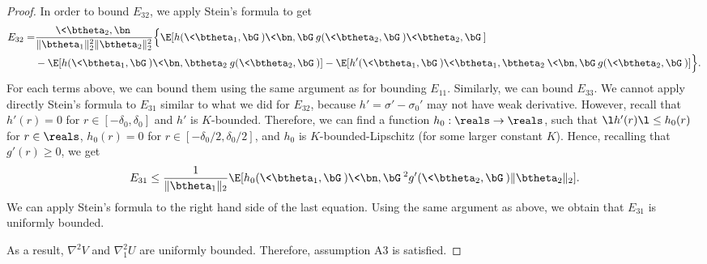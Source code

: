 \documentclass[11pt]{article}
\begin{document}
\begin{proof}
In order to bound $E_{32}$, we apply Stein's formula to get
\begin{equation}
\begin{aligned}
E_{32} =& \frac{\< \btheta_2, \bn\>}{ \| \btheta_1 \|_2^2 \| \btheta_2\|_2^2} \Big\{  \E[h(\< \btheta_1, \bG\>) \< \bn, \bG\> g(\<\btheta_2, \bG \>) \<\btheta_2, \bG \>] \\
& - \E[h(\< \btheta_1, \bG\>) \< \bn, \btheta_2\> g(\<\btheta_2, \bG \>)]  - \E[h'(\< \btheta_1, \bG\>) \< \btheta_1, \btheta_2\> \< \bn, \bG\> g(\<\btheta_2, \bG \>)] \Big\}.
\end{aligned}
\end{equation}
For each terms above, we can bound them using the same argument as for bounding $E_{11}$. Similarly, we can bound $E_{33}$. We cannot apply directly Stein's formula to $E_{31}$ similar to what we did for $E_{32}$, because $h' = \sigma' - \sigma_0'$ may not have weak derivative. However, recall that $h'(r) = 0$ for $r\in [-\delta_0,\delta_0]$ and $h'$ is $K$-bounded. 
Therefore, we can find a function $h_0: \reals \to \reals$, such that $\l h'(r) \l \le h_0(r)$ for $r \in \reals$, $h_0(r) = 0$ for 
$r \in [-\delta_0/2, \delta_0/2]$, and $h_0$ is $K$-bounded-Lipschitz (for some larger constant $K$). Hence, recalling that $g'(r)\ge 0$, we get
\begin{equation}
\begin{aligned}
E_{31} \le \frac{1}{ \| \btheta_1 \|_2} \E[h_0(\< \btheta_1, \bG\>) \< \bn, \bG\>^2 g'(\<\btheta_2, \bG \>) \| \btheta_2 \|_2 ]. 
\end{aligned}
\end{equation}
We can apply Stein's formula to the right hand side of the last equation. Using the same argument
as above, we obtain that $E_{31}$ is uniformly bounded. 

As a result, $\nabla^2 V$ and $\nabla_1^2 U$ are uniformly bounded. Therefore, assumption {\sf A3} is satisfied. 


\end{proof}
\end{document}
